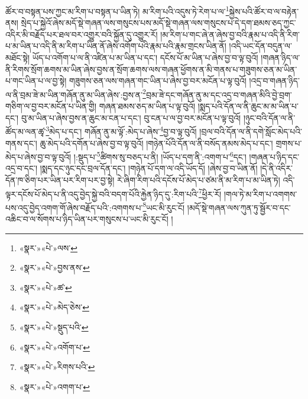 ཚོར་བ་བསྟན་པས་ཀྱང་མ་རིག་པ་བསྟན་པ་ཡིན་ཏེ། མ་རིག་པའི་འདུས་ཏེ་རེག་པ་ལ་\footnote{«སྣར་»«པེ་»ལས་}སྐྱེས་པའི་ཚོར་བ་ལ་བརྟེན་ནས། སྲེད་པ་སྐྱེའོ་ཞེས་མདོ་སྡེ་གཞན་ལས་གསུངས་པས་མདོ་སྡེ་གཞན་ལས་གསུངས་པ་དེ་དག་ཐམས་ཅད་ཀྱང་འདིར་མི་བརྗོད་པར་ཐལ་བར་འགྱུར་བའི་སྐྱོན་དུ་འགྱུར་རོ། །མ་རིག་པ་གང་ཞེ་ན་ཞེས་བྱ་བའི་རྣམ་པ་འདི་ནི་རིག་པ་མ་ཡིན་པ་འདི་ནི་མ་རིག་པ་ཡིན་ནོ་ཞེས་འགོག་པའི་རྣམ་པའི་རྣམ་གྲངས་ཡིན་ནོ། །འདི་ཡང་དོན་བདུན་ལ་མཐོང་སྟེ། ཡོད་པ་འགོག་པ་ལ་ནི་འཛིན་པ་མ་ཡིན་པ་དང་། དངོས་པོ་མ་ཡིན་པ་ཞེས་བྱ་བ་ལྟ་བུའོ། །གཞན་ཉིད་ལ་ནི་རིགས་སྲོག་ཆགས་མ་ཡིན་ཞེས་བྱས་ན་སྲོག་ཆགས་ལས་གཞན་ཕྱོགས་ན་མི་གནས་པ་གཟུགས་ཅན་མ་ཡིན་པ་གང་ཡིན་པ་ལ་བྱ་སྟེ། གཟུགས་ཅན་ལས་གཞན་གང་ཡིན་པ་ཞེས་བྱ་བར་མངོན་པ་ལྟ་བུའོ། །འདྲ་བ་གཞན་ཉིད་ལ་ནི་བྲམ་ཟེ་མ་ཡིན་གཞོན་ནུ་མ་ཡིན་ཞེས་:བྱས་ན་\footnote{«སྣར་»«པེ་»བྱས་ནས་}བྲམ་ཟེ་དང་གཞོན་ནུ་མ་དང་འདྲ་བ་གཞན་མིའི་བྱེ་བྲག་གཅིག་ལ་བྱ་བར་མངོན་པ་ཡིན་གྱི། གཞན་ཐམས་ཅད་མ་ཡིན་པ་ལྟ་བུའོ། །སྨད་པའི་དོན་ལ་ནི་ཆུང་མ་མ་ཡིན་པ་དང་། བུ་མ་ཡིན་པ་ཞེས་བྱས་ན་ཆུང་མ་ངན་པ་དང་། བུ་ངན་པ་ལ་བྱ་བར་མངོན་པ་ལྟ་བུའོ། །ཉུང་བའི་དོན་ལ་ནི་ཚོད་མ་ལན་ཚྭ་\footnote{«སྣར་»«པེ་»ཚ་}མེད་པ་དང་། གཞོན་ནུ་མ་ལྟོ་:མེད་པ་ཞེས་\footnote{«སྣར་»«པེ་»མེད་ཅེས་}བྱ་བ་ལྟ་བུའོ། །བྲལ་བའི་དོན་ལ་ནི་དགེ་སློང་མེད་པའི་གནས་དང་། ཆུ་མེད་པའི་དགོན་པ་ཞེས་བྱ་བ་ལྟ་བུའོ། །གཉེན་པོའི་དོན་ལ་ནི་བསོད་ནམས་མེད་པ་དང་། གྲགས་པ་མེད་པ་ཞེས་བྱ་བ་ལྟ་བུའོ། །:སྡུད་པ་\footnote{«སྣར་»«པེ་»སྡུད་པའི་}ཚིགས་སུ་བཅད་པ་ནི། །ཡོད་པ་དག་ནི་:འགག་པ་\footnote{«སྣར་»«པེ་»འགོག་པ་}དང་། །གཞན་པ་ཉིད་དང་འདྲ་བ་དང་། །སྨད་དང་ཉུང་དང་བྲལ་དོན་དང་། །གཉེན་པོ་དག་ལ་འདི་ཡོད་དོ། །ཞེས་བྱ་བ་ཡིན་ནོ། །དེ་ནི་འདིར་དོན་ཁ་ཅིག་པར་ཡིན་པར་རིག་པར་བྱ་སྟེ། རེ་ཞིག་རིག་པའི་དངོས་པོ་མེད་པ་ཙམ་ནི་མ་རིག་པ་མ་ཡིན་ཏེ། འདི་ལྟར་དངོས་པོ་མེད་པ་ནི་འདུ་བྱེད་སྐྱེ་བའི་བདག་པོའི་རྐྱེན་ཉིད་དུ་:རིག་པའི་\footnote{«སྣར་»«པེ་»རིགས་པའི་}ཕྱིར་རོ། །གལ་ཏེ་མ་རིག་པ་འགགས་པས་འདུ་བྱེད་འགག་གོ་ཞེས་བརྗོད་པའི་:འགགས་པ་\footnote{«སྣར་»«པེ་»འགག་པ་}ཡང་མི་རུང་ངོ། །མདོ་སྡེ་གཞན་ལས་ཀུན་ཏུ་སྦྱོར་བ་དང་འཆིང་བ་ལ་སོགས་པ་ཉིད་ཡིན་པར་གསུངས་པ་ཡང་མི་རུང་ངོ། །
